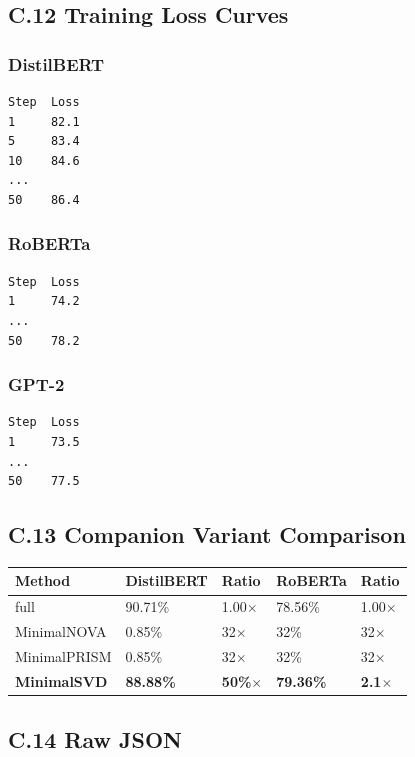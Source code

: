 \subsection{C.12 Training Loss Curves}

\subsubsection{DistilBERT}
\begin{lstlisting}
Step  Loss
1     82.1
5     83.4
10    84.6
...
50    86.4
\end{lstlisting}

\subsubsection{RoBERTa}
\begin{lstlisting}
Step  Loss
1     74.2
...
50    78.2
\end{lstlisting}

\subsubsection{GPT-2}
\begin{lstlisting}
Step  Loss
1     73.5
...
50    77.5
\end{lstlisting}

\subsection{C.13 Companion Variant Comparison}

\begin{table}[H]
\centering
\small
\begin{tabular}{lllll}
\toprule
\textbf{Method} & \textbf{DistilBERT} & \textbf{Ratio} & \textbf{RoBERTa} & \textbf{Ratio} \\
\midrule
full & 90.71\% & 1.00$\times$ & 78.56\% & 1.00$\times$ \\
MinimalNOVA & 0.85\% & 32$\times$ & 32\% & 32$\times$ \\
MinimalPRISM & 0.85\% & 32$\times$ & 32\% & 32$\times$ \\
\textbf{MinimalSVD} & \textbf{88.88\%} & \textbf{50\%$\times$} & \textbf{79.36\%} & \textbf{2.1$\times$} \\
\bottomrule
\end{tabular}
\end{table}

\subsection{C.14 Raw JSON}

